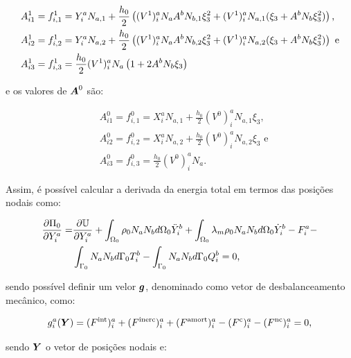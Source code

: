 \begin{subequations}
    \begin{align}
         & A_{i1}^1=f_{i,1}^1=Y_i^aN_{a,1}+\frac{h_0}{2}\left({(V^1)_i^aN_aA^bN_{b,1}\xi_3^2+(V^1)_i^aN_{a,1}(\xi_3+A^bN_b\xi_3^2)}\right)\text{,}  \\
         & A_{i2}^1=f_{i,2}^1=Y_i^aN_{a,2}+\frac{h_0}{2}\left({(V^1)_i^aN_aA^bN_{b,2}\xi_3^2+(V^1)_i^aN_{a,2}(\xi_3+A^bN_b\xi_3^2)}\right)\text{ e} \\
         & A_{i3}^1=f_{i,3}^1=\frac{h_0}{2}(V^1)_i^aN_a\left({1+2A^bN_b\xi_3}\right)
    \end{align}
    \label{eq:CSD-A1}
\end{subequations}

\noindent e os valores de $\boldsymbol{A}^0$ são:

\begin{subequations}
    \begin{align}
         & A_{i1}^0=f_{i,1}^0=X_i^aN_{a,1}+\frac{h_0}{2}(V^0)_i^aN_{a,1}\xi_3\text{,}  \\
         & A_{i2}^0=f_{i,2}^0=X_i^aN_{a,2}+\frac{h_0}{2}(V^0)_i^aN_{a,2}\xi_3\text{ e} \\
         & A_{i3}^0=f_{i,3}^0=\frac{h_0}{2}(V^0)_i^aN_a\text{.}
    \end{align}
    \label{eq:CSD-A0}
\end{subequations}

Assim, é possível calcular a derivada da energia total em termos das posições nodais como:

\begin{equation}
    \begin{split}
        \frac{\partial{\Pi_0}}{\partial{Y_i^a}}=&\frac{\partial{\mathbb{U}}}{\partial{Y_i^a}}
        +\int_{\Omega_0}{\rho_0N_aN_b d\Omega_0}\ddot{Y}_i^b+
        \int_{\Omega_0}{\lambda_m\rho_0N_aN_b d\Omega_0}\dot{Y}_i^b
        -F_i^a-\\
        &\int_{\Gamma_0}{N_aN_b d\Gamma_0}T_i^b
        -\int_{\Gamma_0}{N_aN_b d\Gamma_0}Q_i^b=0\text{,}
    \end{split}
\end{equation}

\noindent sendo possível definir um velor $\boldsymbol{g}$, denominado como vetor de desbalanceamento mecânico, como:

\begin{equation}
    g_i^a(\boldsymbol{Y})=(F^\mathrm{int})_i^a+(F^\mathrm{inerc})_i^a+(F^\mathrm{amort})_i^a-(F^\mathrm{c})_i^a-(F^\mathrm{nc})_i^a=0\text{,}
    \label{eq:CSD-g}
\end{equation}

\noindent sendo $\boldsymbol{Y}$ o vetor de posições nodais e:

